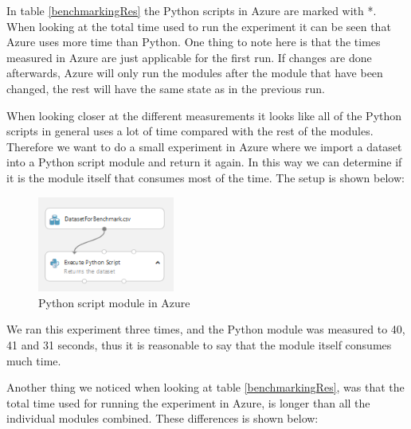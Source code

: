 \documentclass[english, a4paper]{report}
\begin{document}
{{        In table \ref{benchmarkingRes} the Python scripts in Azure are marked with *. When looking at the total time used to run the experiment it can be seen that Azure uses more time than Python. One thing to note here is that the times measured in Azure are just applicable for the first run. If changes are done afterwards, Azure will only run the modules after the module that have been changed, the rest will have the same state as in the previous run.
        \par 
        When looking closer at the different measurements it looks like all of the Python scripts in general uses a lot of time compared with the rest of the modules. Therefore we want to do a small experiment in Azure where we import a dataset into a Python script module and return it again. In this way we can determine if it is the module itself that consumes most of the time. The setup is shown below:
        
        \begin{figure}[H]
            \centering
            \includegraphics[width=0.4\textwidth]{PythonScriptModule}
            \caption{Python script module in Azure}
            \label{fig:pythonScript}
        \end{figure}
        
        We ran this experiment three times, and the Python module was measured to 40, 41 and 31 seconds, thus it is reasonable to say that the module itself consumes much time. 
        \par 
        Another thing we noticed when looking at table \ref{benchmarkingRes}, was that the total time used for running the experiment in Azure, is longer than all the individual modules combined. These differences is shown below:
        
}}
\end{document}
